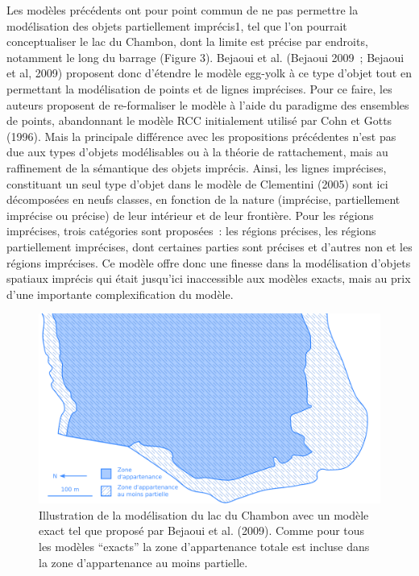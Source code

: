 Les modèles précédents ont pour point commun de ne pas permettre la
modélisation des objets partiellement imprécis1, tel que l’on pourrait
conceptualiser le lac du Chambon, dont la limite est précise par
endroits, notamment le long du barrage (Figure 3). Bejaoui et
al. (Bejaoui 2009 ; Bejaoui et al, 2009) proposent donc d’étendre le
modèle egg-yolk à ce type d’objet tout en permettant la modélisation
de points et de lignes imprécises. Pour ce faire, les auteurs
proposent de re-formaliser le modèle à l’aide du paradigme des
ensembles de points, abandonnant le modèle RCC initialement utilisé
par Cohn et Gotts (1996). Mais la principale différence avec les
propositions précédentes n’est pas due aux types d’objets modélisables
ou à la théorie de rattachement, mais au raffinement de la sémantique
des objets imprécis. Ainsi, les lignes imprécises, constituant un seul
type d’objet dans le modèle de Clementini (2005) sont ici décomposées
en neufs classes, en fonction de la nature (imprécise, partiellement
imprécise ou précise) de leur intérieur et de leur frontière. Pour les
régions imprécises, trois catégories sont proposées : les régions
précises, les régions partiellement imprécises, dont certaines parties
sont précises et d’autres non et les régions imprécises. Ce modèle
offre donc une finesse dans la modélisation d’objets spatiaux imprécis
qui était jusqu’ici inaccessible aux modèles exacts, mais au prix
d’une importante complexification du modèle.

\begin{figure}
  \centering
  \includegraphics{../figures/fig7.png}
  \caption{Illustration de la modélisation du lac du Chambon avec un
    modèle exact tel que proposé par Bejaoui et al. (2009). Comme pour
    tous les modèles “exacts” la zone d’appartenance totale est
    incluse dans la zone d’appartenance au moins partielle.}
  \label{fig:champ_exact}
\end{figure}

